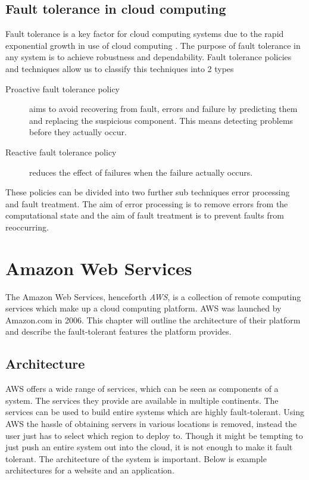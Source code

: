 \documentclass[11pt]{report}
\begin{document}
\section{Fault tolerance in cloud computing}
Fault tolerance is a key factor for cloud computing systems due to the rapid exponential growth in use of cloud computing \cite{faulttolerancetechniques}. The purpose of fault tolerance in any system is to achieve robustness and dependability. Fault tolerance policies and techniques allow us to classify this techniques into 2 types
\begin{description}
\item[Proactive fault tolerance policy] aims to avoid recovering from fault, errors and failure by predicting them and replacing the suspicious component. This means detecting problems before they actually occur.
\item[Reactive fault tolerance policy] reduces the effect of failures when the failure actually occurs.
\end{description}
These policies can be divided into two further sub techniques error processing and fault treatment. The aim of error processing is to remove errors from the computational state and the aim of fault treatment is to prevent faults from reoccurring.

\chapter{Amazon Web Services}
The Amazon Web Services, henceforth \emph{AWS}, is a collection of remote computing services which make up a cloud computing platform. AWS was launched by Amazon.com in 2006. This chapter will outline the architecture of their platform and describe the fault-tolerant features the platform provides.

\section{Architecture}
AWS offers a wide range of services, which can be seen as components of a system. The services they provide are available in multiple continents. The services can be used to build entire systems which are highly fault-tolerant. Using AWS the hassle of obtaining servers in various locations is removed, instead the user just has to select which region to deploy to. Though it might be tempting to just push an entire system out into the cloud, it is not enough to make it fault tolerant. The architecture of the system is important. Below is example architectures for a website and an application.
\end{document}
